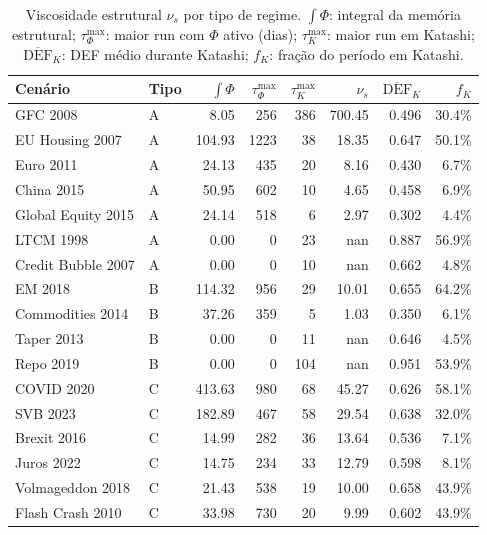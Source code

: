 \begin{table}[htbp]
\centering
\small
\begin{tabular}{llrrrrrr}
\toprule
Cenário & Tipo & $\int\Phi$ & $\tau_\Phi^{\max}$ & $\tau_K^{\max}$ & $\nu_s$ & $\overline{\text{DEF}}_K$ & $f_K$ \\
\midrule
  GFC 2008 & A & 8.05 & 256 & 386 & 700.45 & 0.496 & 30.4\% \\
  EU Housing 2007 & A & 104.93 & 1223 & 38 & 18.35 & 0.647 & 50.1\% \\
  Euro 2011 & A & 24.13 & 435 & 20 & 8.16 & 0.430 & 6.7\% \\
  China 2015 & A & 50.95 & 602 & 10 & 4.65 & 0.458 & 6.9\% \\
  Global Equity 2015 & A & 24.14 & 518 & 6 & 2.97 & 0.302 & 4.4\% \\
  LTCM 1998 & A & 0.00 & 0 & 23 & nan & 0.887 & 56.9\% \\
  Credit Bubble 2007 & A & 0.00 & 0 & 10 & nan & 0.662 & 4.8\% \\
\midrule
  EM 2018 & B & 114.32 & 956 & 29 & 10.01 & 0.655 & 64.2\% \\
  Commodities 2014 & B & 37.26 & 359 & 5 & 1.03 & 0.350 & 6.1\% \\
  Taper 2013 & B & 0.00 & 0 & 11 & nan & 0.646 & 4.5\% \\
  Repo 2019 & B & 0.00 & 0 & 104 & nan & 0.951 & 53.9\% \\
\midrule
  COVID 2020 & C & 413.63 & 980 & 68 & 45.27 & 0.626 & 58.1\% \\
  SVB 2023 & C & 182.89 & 467 & 58 & 29.54 & 0.638 & 32.0\% \\
  Brexit 2016 & C & 14.99 & 282 & 36 & 13.64 & 0.536 & 7.1\% \\
  Juros 2022 & C & 14.75 & 234 & 33 & 12.79 & 0.598 & 8.1\% \\
  Volmageddon 2018 & C & 21.43 & 538 & 19 & 10.00 & 0.658 & 43.9\% \\
  Flash Crash 2010 & C & 33.98 & 730 & 20 & 9.99 & 0.602 & 43.9\% \\
\bottomrule
\end{tabular}
\caption{Viscosidade estrutural $\nu_s$ por tipo de regime. $\int\Phi$: integral da mem\'{o}ria estrutural; $\tau_\Phi^{\max}$: maior run com $\Phi$ ativo (dias); $\tau_K^{\max}$: maior run em Katashi; $\overline{\text{DEF}}_K$: DEF m\'{e}dio durante Katashi; $f_K$: fra\c{c}\~{a}o do per\'{i}odo em Katashi.}
\label{tab:viscosity}
\end{table}